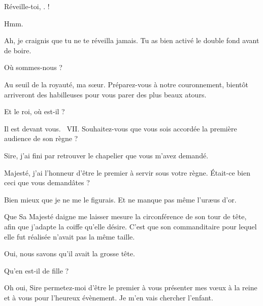 \begin{drama}
  \elenaspeaks {} Réveille-toi, \ela. \ela !

  \elaspeaks {} Hmm.

  \elenaspeaks Ah, je craignis que tu ne te réveilla jamais. Tu as bien activé le double fond avant de boire.

  \elaspeaks {} Où sommes-nous ?

  \elenaspeaks Au seuil de la royauté, ma sœur. Préparez-vous à notre couronnement, bientôt arriveront des habilleuses pour vous parer des plus beaux atours.

  \elaspeaks Et le roi, où est-il ?

  \elenaspeaks Il est devant vous. \elena~VII. Souhaitez-vous que vous sois accordée la première audience de son règne ?


  \alexasspeaks Sire, j’ai fini par retrouver le chapelier que vous m’avez demandé.

  \chapelierspeaks Majesté, j’ai l’honneur d’être le premier à servir sous votre règne. Était-ce bien ceci que vous demandâtes ?


  \alexasspeaks Bien mieux que je ne me le figurais. Et ne manque pas même l’uræus d’or.

  \chapelierspeaks Que Sa Majesté daigne me laisser mesure la circonférence de son tour de tête, afin que j’adapte la coiffe qu’elle désire. C’est que son commanditaire pour lequel elle fut réalisée n’avait pas la même taille.

  \alexasspeaks Oui, nous savons qu’il avait la grosse tête.


  \exit{\chapelier}


  \elenaspeaks Qu’en est-il de  fille \alexas ? 

  \alexasspeaks Oh oui, Sire permetez-moi d’être le premier à vous présenter mes vœux à la reine et à vous pour l’heureux évènement. Je m’en vais chercher l’enfant.

  \exit{\alexas}


\end{drama}
